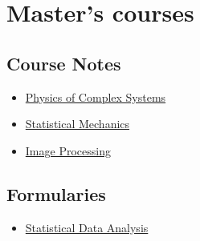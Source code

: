 \documentclass{article}
\begin{document}
\section{Master's courses}

\subsection{Course Notes}

    \begin{itemize}
        \item \href{source/m_physics_of_complex_systems.html}{Physics of Complex Systems}
        \item \href{source/m_statistical_mechanics.html}{Statistical Mechanics}
        \item \href{source/m_image_processing.html}{Image Processing}
    \end{itemize}

\subsection{Formularies}

    \begin{itemize}
        \item \href{source/m_formulary_statistical_data_analysis.html}{Statistical Data Analysis}
    \end{itemize}
\end{document}
